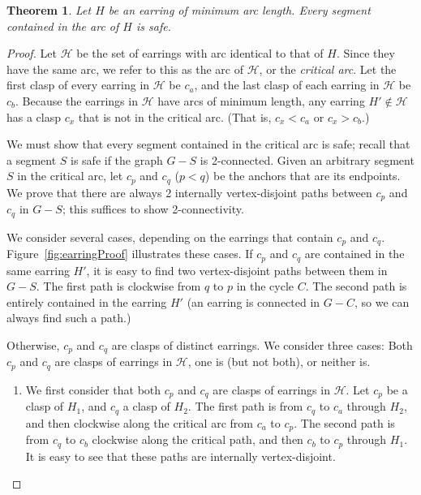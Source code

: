 \documentclass[11pt]{article}
\newtheorem{theorem}[lemma]{Theorem}
\newcommand{\script}[1]{\mathcal{#1}}
\begin{document}
\begin{theorem}\label{thm:earringProof}
Let $H$ be an earring of minimum arc length. Every segment contained
in the arc of $H$ is safe.
\end{theorem}
\begin{proof}
  Let $\script{H}$ be the set of earrings with arc identical to that
  of $H$. Since they have the same arc, we refer to this as the arc of
  $\script{H}$, or the \emph{critical arc}. Let the first clasp of
  every earring in $\script{H}$ be $c_a$, and the last clasp of each
  earring in $\script{H}$ be $c_b$. Because the earrings in
  $\script{H}$ have arcs of minimum length, any earring $H' \notin
  \script{H}$ has a clasp $c_x$ that is not in the critical arc. (That
  is, $c_x < c_a$ or $c_x > c_b$.)

  We must show that every segment contained in the critical arc is
  safe; recall that a segment $S$ is safe if the graph $G-S$ is
  2-connected.  Given an arbitrary segment $S$ in the critical arc,
  let $c_p$ and $c_q$ ($p < q$) be the anchors that are its
  endpoints. We prove that there are always 2 internally
  vertex-disjoint paths between $c_p$ and $c_q$ in $G - S$; this
  suffices to show 2-connectivity.

  We consider several cases, depending on the earrings that contain
  $c_p$ and $c_q$. Figure~\ref{fig:earringProof} illustrates these
  cases.  If $c_p$ and $c_q$ are contained in the same earring $H'$,
  it is easy to find two vertex-disjoint paths between them in
  $G-S$. The first path is clockwise from $q$ to $p$ in the cycle
  $C$. The second path is entirely contained in the earring $H'$ (an
  earring is connected in $G-C$, so we can always find such a path.)

  Otherwise, $c_p$ and $c_q$ are clasps of distinct earrings. We
  consider three cases: Both $c_p$ and $c_q$ are clasps of earrings in
  $\script{H}$, one is (but not both), or neither is.
  \begin{enumerate}
  \item We first consider that both $c_p$ and $c_q$ are clasps of
    earrings in $\script{H}$. Let $c_p$ be a clasp of $H_1$, and $c_q$
    a clasp of $H_2$. The first path is from $c_q$ to $c_a$ through
    $H_2$, and then clockwise along the critical arc from $c_a$ to
    $c_p$. The second path is from $c_q$ to $c_b$ clockwise along the
    critical path, and then $c_b$ to $c_p$ through $H_1$. It is easy
    to see that these paths are internally vertex-disjoint.


\end{enumerate}
\end{proof}
\end{document}
